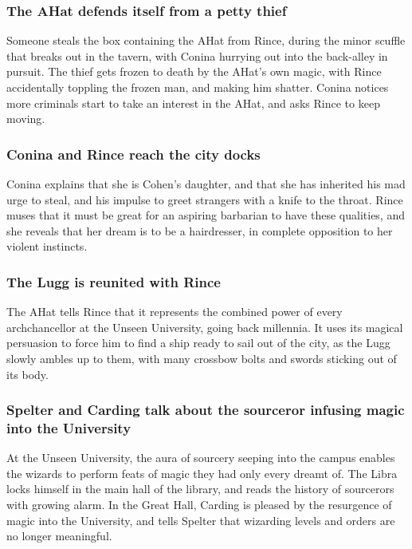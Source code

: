 \subsubsection{The \Gls{AHat} defends itself from a petty thief}
Someone steals the box containing the \Gls{AHat} from \Gls{Rince}, during the minor scuffle that
breaks out in the tavern, with \Gls{Conina} hurrying out into the back-alley in pursuit. The thief
gets frozen to death by the \Gls{AHat}'s own magic, with \Gls{Rince} accidentally toppling the
frozen man, and making him shatter. \Gls{Conina} notices more criminals start to take an interest
in the \Gls{AHat}, and asks \Gls{Rince} to keep moving.

\subsubsection{\Gls{Conina} and \Gls{Rince} reach the city docks}
\Gls{Conina} explains that she is \Gls{Cohen}'s daughter, and that she has inherited his mad urge
to steal, and his impulse to greet strangers with a knife to the throat. \Gls{Rince} muses that it
must be great for an aspiring barbarian to have these qualities, and she reveals that her dream is
to be a hairdresser, in complete opposition to her violent instincts.

\subsubsection{The \Gls{Lugg} is reunited with \Gls{Rince}}
The \Gls{AHat} tells \Gls{Rince} that it represents the combined power of every archchancellor at
the Unseen University, going back millennia. It uses its magical persuasion to force him to find a
ship ready to sail out of the city, as the \Gls{Lugg} slowly ambles up to them, with many crossbow
bolts and swords sticking out of its body.

\subsubsection{\Gls{Spelter} and \Gls{Carding} talk about the sourceror infusing magic into the
    University}
At the Unseen University, the aura of sourcery seeping into the campus enables the wizards to
perform feats of magic they had only every dreamt of. The \Gls{Libra} locks himself in the main hall
of the library, and reads the history of sourcerors with growing alarm. In the Great Hall,
\Gls{Carding} is pleased by the resurgence of magic into the University, and tells \Gls{Spelter}
that wizarding levels and orders are no longer meaningful.


